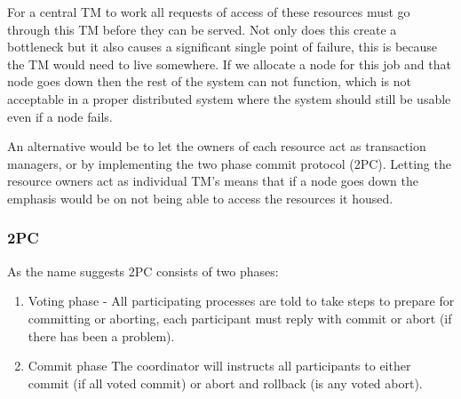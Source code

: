 \documentclass[a4paper,12pt]{article}
\begin{document}
For a central TM to work all requests of access of these resources must go through this TM before they can be served.
Not only does this create a bottleneck but it also causes a significant single point of failure, this is because the TM would need to live somewhere. 
If we allocate a node for this job and that node goes down then the rest of the system can not function, which is not acceptable in a proper distributed system where the system should still be usable even if a node fails.


An alternative would be to let the owners of each resource act as transaction managers, or by implementing the two phase commit protocol (2PC).
Letting the resource owners act as individual TM's means that if a node goes down the emphasis would be on not being able to access the resources it housed.

\subsubsection*{2PC}
As the name suggests 2PC consists of two phases:
\begin{enumerate}
    \item{Voting phase - All participating processes are told to take steps to prepare for committing or aborting, each participant must reply with commit or abort (if there has been a problem).}
    \item{Commit phase  The coordinator will instructs all participants to either commit (if all voted commit) or abort and rollback (is any voted abort).}
\end{enumerate}






\vskip 0.2in
\newpage


\end{document}
